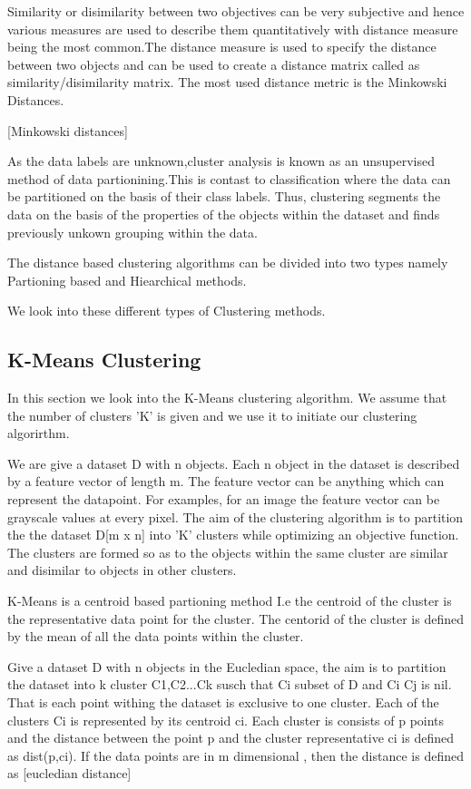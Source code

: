Similarity or disimilarity between two objectives can be very subjective and hence various measures are used to describe them quantitatively with distance measure being the most common.The distance measure is used to specify the distance between two objects and can be used to create a distance matrix called as similarity/disimilarity matrix. The most used distance metric is the Minkowski Distances.

[Minkowski distances]

As the data labels are unknown,cluster analysis is known as an unsupervised method of data partionining.This is contast to classification where the data can be partitioned on the basis of their class labels. Thus, clustering segments the data on the basis of the properties of the objects within the dataset and finds previously unkown grouping within the data.

The distance based clustering algorithms can be divided into two types namely Partioning based and Hiearchical methods.

We look into these different types of Clustering methods.

\subsection{K-Means Clustering}
In this section we look into the K-Means clustering algorithm. We assume that the number of clusters 'K' is given and we use it to initiate our clustering algorirthm. 

We are give a dataset D with n objects. Each n object in the dataset is described by a feature vector of length m. The feature vector can be anything which can represent the datapoint. For examples, for an image the feature vector can be grayscale values at every pixel. The aim of the clustering algorithm is to partition the the dataset D[m x n] into 'K' clusters while optimizing an objective function. The clusters are formed so as to the objects within the same cluster are similar and disimilar to objects in other clusters.


K-Means is a centroid based partioning method I.e the centroid of the cluster is the representative data point for the cluster. The centorid of the cluster is defined by the mean of all the data points within the cluster.

Give a dataset D with n objects in the Eucledian space, the aim is to partition the dataset into k cluster C1,C2...Ck susch that Ci subset of D and Ci Cj is nil. That is each point withing the dataset is exclusive to one cluster.
Each of the clusters Ci is represented by its centroid ci. Each cluster is consists of p points and the distance between the point p and the cluster representative ci is defined as dist(p,ci). If the data points are in m dimensional , then the distance is defined as
[eucledian distance]

